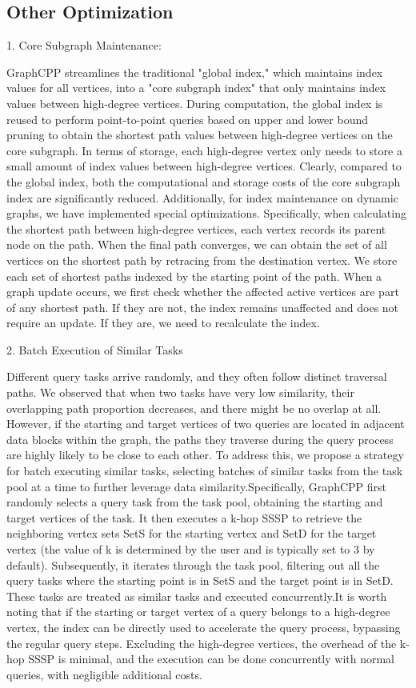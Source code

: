 \documentclass[lettersize,journal]{IEEEtran} %
\begin{document}
\subsection{Other Optimization}
1. Core Subgraph Maintenance:

GraphCPP streamlines the traditional "global index," which maintains index values for all vertices, into a "core subgraph index" that only maintains index values between high-degree vertices. During computation, the global index is reused to perform point-to-point queries based on upper and lower bound pruning to obtain the shortest path values between high-degree vertices on the core subgraph. In terms of storage, each high-degree vertex only needs to store a small amount of index values between high-degree vertices. Clearly, compared to the global index, both the computational and storage costs of the core subgraph index are significantly reduced. Additionally, for index maintenance on dynamic graphs, we have implemented special optimizations. Specifically, when calculating the shortest path between high-degree vertices, each vertex records its parent node on the path. When the final path converges, we can obtain the set of all vertices on the shortest path by retracing from the destination vertex. We store each set of shortest paths indexed by the starting point of the path. When a graph update occurs, we first check whether the affected active vertices are part of any shortest path. If they are not, the index remains unaffected and does not require an update. If they are, we need to recalculate the index.

2. Batch Execution of Similar Tasks

Different query tasks arrive randomly, and they often follow distinct traversal paths. We observed that when two tasks have very low similarity, their overlapping path proportion decreases, and there might be no overlap at all. However, if the starting and target vertices of two queries are located in adjacent data blocks within the graph, the paths they traverse during the query process are highly likely to be close to each other. To address this, we propose a strategy for batch executing similar tasks, selecting batches of similar tasks from the task pool at a time to further leverage data similarity.Specifically, GraphCPP first randomly selects a query task from the task pool, obtaining the starting and target vertices of the task. It then executes a k-hop SSSP to retrieve the neighboring vertex sets SetS for the starting vertex and SetD for the target vertex (the value of k is determined by the user and is typically set to 3 by default). Subsequently, it iterates through the task pool, filtering out all the query tasks where the starting point is in SetS and the target point is in SetD. These tasks are treated as similar tasks and executed concurrently.It is worth noting that if the starting or target vertex of a query belongs to a high-degree vertex, the index can be directly used to accelerate the query process, bypassing the regular query steps. Excluding the high-degree vertices, the overhead of the k-hop SSSP is minimal, and the execution can be done concurrently with normal queries, with negligible additional costs.
\end{document}
